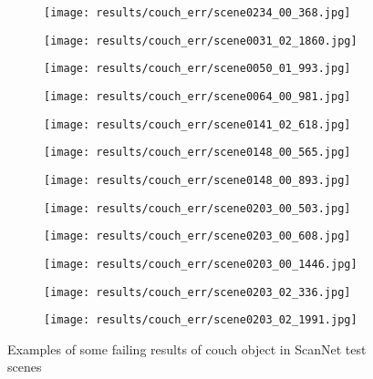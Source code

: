 \begin{figure}[h!]
  \centering
  \begin{subfigure}[b]{0.32\linewidth}
    \texttt{[image: results/couch\_err/scene0234\_00\_368.jpg]}
  \end{subfigure}
  \begin{subfigure}[b]{0.32\linewidth}
    \texttt{[image: results/couch\_err/scene0031\_02\_1860.jpg]}
  \end{subfigure}
  \begin{subfigure}[b]{0.32\linewidth}
    \texttt{[image: results/couch\_err/scene0050\_01\_993.jpg]}
  \end{subfigure}
  \begin{subfigure}[b]{0.32\linewidth}
    \texttt{[image: results/couch\_err/scene0064\_00\_981.jpg]}
  \end{subfigure}
  \begin{subfigure}[b]{0.32\linewidth}
    \texttt{[image: results/couch\_err/scene0141\_02\_618.jpg]}
  \end{subfigure}
  \begin{subfigure}[b]{0.32\linewidth}
    \texttt{[image: results/couch\_err/scene0148\_00\_565.jpg]}
  \end{subfigure}
  \begin{subfigure}[b]{0.32\linewidth}
    \texttt{[image: results/couch\_err/scene0148\_00\_893.jpg]}
  \end{subfigure}
  \begin{subfigure}[b]{0.32\linewidth}
    \texttt{[image: results/couch\_err/scene0203\_00\_503.jpg]}
  \end{subfigure}
  \begin{subfigure}[b]{0.32\linewidth}
    \texttt{[image: results/couch\_err/scene0203\_00\_608.jpg]}
  \end{subfigure}
  \begin{subfigure}[b]{0.32\linewidth}
    \texttt{[image: results/couch\_err/scene0203\_00\_1446.jpg]}
  \end{subfigure}
  \begin{subfigure}[b]{0.32\linewidth}
    \texttt{[image: results/couch\_err/scene0203\_02\_336.jpg]}
  \end{subfigure}
  \begin{subfigure}[b]{0.32\linewidth}
    \texttt{[image: results/couch\_err/scene0203\_02\_1991.jpg]}
  \end{subfigure}
  \caption{Examples of some failing results of couch object in ScanNet test scenes}
  \label{fig:result_couch_err}
\end{figure}

